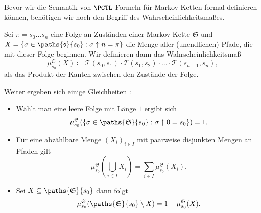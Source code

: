Bevor wir die Semantik von $\PCTL$-Formeln für Markov-Ketten formal definieren können, benötigen wir noch den Begriff des Wahrscheinlichkeitsmaßes.

\begin{definition}[Wahrscheinlichkeitsmaß]
	Sei $\pi = s_0\dots s_n$ eine Folge an Zuständen einer Markov-Kette $\mathfrak{S}$ und $X=\{\sigma\in \paths{\mathfrak{s}}{s_0} : \sigma\uparrow n = \pi\}$ die Menge aller (unendlichen) Pfade, die mit dieser Folge beginnen. Wir definieren dann das Wahrscheinlichkeitsmaß 
	$$\mu^{\mathfrak{S}}_{s_0}(X)\coloneqq\mathcal{T}(s_0,s_1)\cdot \mathcal{T}(s_1,s_2)\cdot \ldots \cdot \mathcal{T}(s_{n-1},s_n),$$
	als das Produkt der Kanten zwischen den Zustände der Folge. \cite{hansson1994logic}
\end{definition}

Weiter ergeben sich einige Gleichheiten \cite{hansson1994logic}:
\begin{itemize}
	\item Wählt man eine leere Folge mit Länge $1$ ergibt sich
	\begin{equation}\mu^\mathfrak{S}_{s_0}(\{\sigma\in \paths{\mathfrak{S}}{s_0} : \sigma\uparrow 0 = s_0\})=1.\end{equation}
	\item Für eine abzählbare Menge $(X_i)_{i\in I}$ mit paarweise disjunkten Mengen an Pfaden gilt
	\begin{equation}\mu^\mathfrak{S}_{s_0}(\bigcup_{i\in I}X_i) = \sum_{i\in I}\mu^\mathfrak{S}_{s_0}(X_i).\end{equation}
	\item Sei $X\subseteq \paths{\mathfrak{S}}{s_0}$ dann folgt 
	\begin{equation}\mu^\mathfrak{S}_{s_0}(\paths{\mathfrak{S}}{s_0} \setminus X) = 1-\mu^\mathfrak{S}_{s_0}(X).\label{MassUmkehrung}\end{equation}
\end{itemize}

